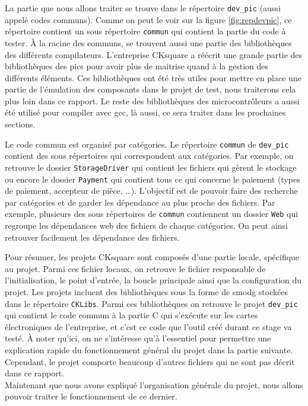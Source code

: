 \documentclass[a4paper]{article}
\begin{document}
La partie que nous allons traiter se trouve dans le répertoire \verb|dev_pic|
(aussi appelé codes communs). Comme on peut le voir sur la figure
\ref{fig:repdevpic}, ce répertoire contient un sous répertoire \verb|commun| qui
contient la partie du code à tester. À la racine des communs, se trouvent aussi
une partie des bibliothèques des différents compilateurs. L'entreprise CKsquare
a réécrit une grande partie des bibliothèques des \gls{pic}s pour avoir plus de
maitrise quand à la gestion des différents éléments. Ces bibliothèques ont été
très utiles pour mettre en place une partie de l'émulation des composants dans
le projet de test, nous traiterons cela plus loin dans ce rapport. Le reste des
bibliothèques des microcontrôleurs a aussi été utilisé pour compiler avec gcc,
là aussi, ce sera traiter dans les prochaines sections.

Le code commun est organisé par catégories. Le répertoire \verb|commun| de
\verb|dev_pic| contient des sous répertoires qui correspondent aux
catégories. Par exemple, on retrouve le dossier \verb|StorageDriver| qui
contient les fichiers qui gèrent le stockage ou encore le dossier
\verb|Payment| qui contient tous ce qui concerne le paiement (types de
paiement, accepteur de pièce, \dots). L'objectif est de pouvoir faire des
recherche par catégories et de garder les dépendance au plus proche des
fichiers. Par exemple, plusieurs des sous répertoires de \verb|commun|
contiennent un dossier \verb|Web| qui regroupe les dépendances web des
fichiers de chaque catégories. On peut ainsi retrouver facilement les dépendance
des fichiers.

Pour résumer, les projets CKsquare sont composés d'une partie locale, spécifique
au projet. Parmi ces fichier locaux, on retrouve le fichier responsable de
l'initialisation, le point d'entrée, la boucle principale ainsi que la
configuration du projet. Les projets incluent des bibliothèques sous la forme de
\gls{smodg} stockées dans le répertoire \verb|CKLibs|. Parmi ces
bibliothèques on retrouve le projet \verb|dev_pic| qui contient le code
commun à la partie C qui s'exécute sur les cartes électroniques de l'entreprise,
et c'est ce code que l'outil créé durant ce stage va testé. À noter qu'ici, on
ne s'intéresse qu'à l'essentiel pour permettre une explication rapide du
fonctionnement général du projet dans la partie suivante. Cependant, le projet
comporte beaucoup d'autres fichiers qui ne sont pas décrit dans ce rapport.\\

Maintenant que nous avons expliqué l'organisation générale du projet, nous
allons pouvoir traiter le fonctionnement de ce dernier.
\end{document}
